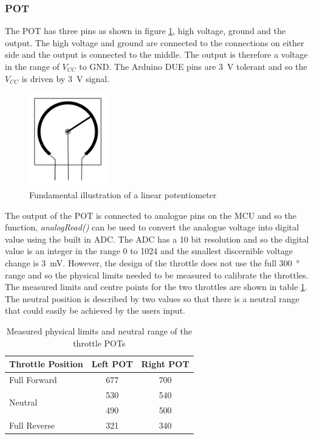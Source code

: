 		\subsubsection{POT}
		The POT has three pins as shown in figure \ref{fig:3:POTdraw}, high voltage, ground and the output. The high voltage and ground are connected to the connections on either side and the output is connected to the middle. The output is therefore a voltage in the range of $V_{CC}$ to GND. The Arduino DUE pins are \SI{3}{\volt} tolerant and so the $V_{CC}$ is driven by \SI{3}{\volt} signal. \par
		\vspace{0.4cm}
		\begin{figure}[ht]
			\begin{center}
				\includegraphics[width = 0.3\textwidth]{figures/POT.jpg}
				\caption{Fundamental illustration of a linear potentiometer}
				\label{fig:3:POTdraw}
			\end{center}
		\end{figure}
		The output of the POT is connected to analogue pins on the MCU and so the function, \textit{analogRead()} can be used to convert the analogue voltage into digital value using the built in ADC. The ADC has a 10 bit resolution and so the digital value is an integer in the range 0 to 1024 and the smallest discernible voltage change is \SI{3}{\milli\volt}. However, the design of the throttle does not use the full \SI{300}{\degree} range and so the physical limits needed to be measured to calibrate the throttles. The measured limits and centre points for the two throttles are shown in table \ref{tab:3:POT}. The neutral position is described by two values so that there is a neutral range that could easily be achieved by the users input. \par
		\begin{table}[ht]
			\begin{center}
				\caption{Measured physical limits and neutral range of the throttle POTs}
				\label{tab:3:POT}
				\begin{tabular}{|l|c|c|}
					\hline		
					\textbf{Throttle Position} & \textbf{Left POT} & \textbf{Right POT} \\
					\hline
					Full Forward & 677 & 700\\
					\hline
					\multirow{2}{*}{Neutral} &530 &540 \\
					&490 &500  \\
					\hline
					Full Reverse & 321 & 340 \\
					\hline
				\end{tabular}
			\end{center}
		\end{table}
